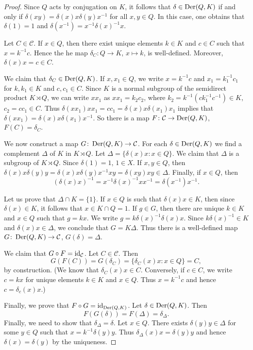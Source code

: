 \begin{proof}
	Since $Q$ acts by conjugation on $K$, it follows that $\delta\in\operatorname{Der}(Q,K)$ if and only if 
	$\delta(xy)=\delta(x)x\delta(y)x^{-1}$ for all $x,y\in Q$. In this case, 
	one obtains that 
	$\delta(1)=1$ and $\delta(x^{-1})=x^{-1}\delta(x)^{-1}x$.
	
	Let 
	$C\in\mathcal{C}$. If $x\in Q$, then there exist unique elements  
	$k\in K$ and $c\in C$ such that $x=k^{-1}c$. Hence the he map 
	$\delta_C\colon Q\to K$, $x\mapsto k$, is well-defined. Moreover, 
	$\delta(x)x=c\in C$. 
	
	We claim that $\delta_C\in\operatorname{Der}(Q,K)$. If $x,x_1\in Q$, we write $x=k^{-1}c$
	and $x_1=k_1^{-1}c_1$ for $k,k_1\in K$ and $c,c_1\in C$. Since $K$ is a normal subgroup of 
	the semidirect product $K\rtimes Q$, we can write $xx_1$ as $xx_1=k_2c_2$, where 
	$k_2=k^{-1}(ck_1^{-1}c^{-1})\in K$, $c_2=cc_1\in C$. Thus  
	$\delta(xx_1)xx_1=cc_1=\delta(x)x\delta(x_1)x_1$ 
	implies that $\delta(xx_1)=\delta(x)x\delta(x_1)x^{-1}$. 
	So there is a map $F\colon\mathcal{C}\to\operatorname{Der}(Q,K)$, $F(C)=\delta_C$.

	We now construct a map $G\colon\operatorname{Der}(Q,K)\to\mathcal{C}$. 
	For each 
	$\delta\in\operatorname{Der}(Q,K)$ we find a complement $\Delta$ of $K$ in $K\rtimes Q$. Let 
	$\Delta=\{\delta(x)x:x\in Q\}$. 
	We claim that $\Delta$ is a subgroup of $K\rtimes Q$. Since $\delta(1)=1$,
	$1\in X$. If $x,y\in Q$, then 
	$\delta(x)x\delta(y)y=\delta(x)x\delta(y)x^{-1}xy=\delta(xy)xy\in \Delta$.
	Finally, if $x\in Q$, then 
	\[
	(\delta(x)x)^{-1}=x^{-1}\delta(x)^{-1}xx^{-1}=\delta(x^{-1})x^{-1}.
	\]
	
	Let us prove that $\Delta\cap K=\{1\}$. If $x\in Q$ is such that $\delta(x)x\in K$, then 
    since $\delta(x)\in K$, it follows that $x\in K\cap Q=1$. If $g\in G$, then 
	there are unique $k\in K$ and $x\in Q$ such that $g=kx$. We write 
	$g=k\delta(x)^{-1}\delta(x)x$. Since $k\delta(x)^{-1}\in K$ and $\delta(x)x\in
	\Delta$, we conclude that $G=K\Delta$. Thus there is a well-defined map 
	$G\colon\operatorname{Der}(Q,K)\to\mathcal{C}$, $G(\delta)=\Delta$.

	We claim that $G\circ F=\operatorname{id}_{\mathcal{C}}$. 
	Let $C\in\mathcal{C}$. Then  
	\[
	G(F(C))=G(\delta_C)=\{\delta_C(x)x:x\in
	Q\}=C,
	\]
	by construction. (We know that $\delta_C(x)x\in C$. Conversely, if $c\in
	C$, we write $c=kx$ for unique elements $k\in K$ and $x\in Q$. Thus $x=k^{-1}c$
	and hence $c=\delta_c(x)x$.)

	Finally, we prove that $F\circ G=\operatorname{id}_{\operatorname{Der}(Q,K)}$. Let $\delta\in\operatorname{Der}(Q,K)$.
    Then	
    \[
	F(G(\delta))=F(\Delta)=\delta_{\Delta}.
	\]
	Finally, we need to show that $\delta_\Delta=\delta$.  Let $x\in Q$. There exists 
	$\delta(y)y\in\Delta$ for some $y\in Q$ such that $x=k^{-1}\delta(y)y$.
	Thus $\delta_{\Delta}(x)x=\delta(y)y$ and hence $\delta(x)=\delta(y)$ by
	the uniqueness. 
\end{proof}


